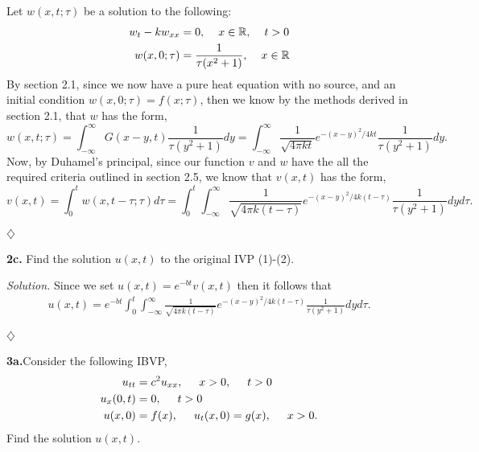 \documentclass{article}
\begin{document}
Let \(w(x,t;\tau)\) be a solution to the following:
\begin{align*}
w_t - kw_{xx} &= 0, \hspace{4mm} x\in\mathbb{R}, \hspace{4mm}t>0\\
w(x,0;\tau)&= \frac{1}{\tau(x^2+1)}, \hspace{4mm} x\in\mathbb{R}
\end{align*}
By section 2.1, since we now have a pure heat equation with no source, and an initial condition \(w(x,0;\tau)=f(x;\tau)\), then we know by the methods derived in section 2.1, that \(w\) has the form, 
\[
w(x,t;\tau) = \int_{-\infty}^{\infty} G(x-y,t)\frac{1}{\tau(y^2+1)} dy= \int_{-\infty}^{\infty} \frac{1}{\sqrt{4\pi kt}}e^{-(x-y)^2/4kt }\frac{1}{\tau(y^2+1)} dy.
\]
Now, by Duhamel's principal, since our function \(v\) and \(w\) have the all the required criteria outlined in section 2.5, we know that \(v(x,t)\) has the form,
\[
v(x,t) = \int_0^t w(x,t-\tau;\tau) d\tau = \int_0^t \int_{-\infty}^{\infty} \frac{1}{\sqrt{4\pi k(t-\tau)}}e^{-(x-y)^2/4k(t-\tau )}\frac{1}{\tau(y^2+1)} dy d\tau.
\]
\begin{flushright}
\( \diamondsuit \)
\end{flushright}














\textbf{2c.} Find the solution \(u(x,t)\) to the original IVP (1)-(2). 


\vspace{3mm}
\textit{Solution.} Since we set \(u(x,t) = e^{-bt}v(x,t)\) then it follows that 
\begin{align*}
u(x,t) = e^{-bt}\int_0^t \int_{-\infty}^{\infty} \frac{1}{\sqrt{4\pi k(t-\tau)}}e^{-(x-y)^2/4k(t-\tau )}\frac{1}{\tau(y^2+1)} dy d\tau.
\end{align*}
\begin{flushright}
\( \diamondsuit \)
\end{flushright}








\newpage
\textbf{3a.}Consider the following IBVP,
\begin{align}
u_{tt} &= c^2 u_{xx}, \hspace{5mm} x>0, \hspace{5mm} t>0\\
u_x(0,t)&= 0, \hspace{5mm}t>0 \\
u(x,0) &= f(x), \hspace{5mm} u_t(x,0)=g(x), \hspace{5mm} x>0.
\end{align}
Find the solution \(u(x,t)\). 
\end{document}
